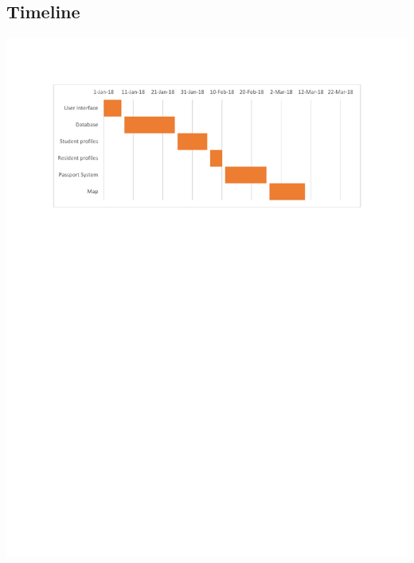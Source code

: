 \documentclass[draftclsnofoot, onecolumn, 10pt, compsoc]{IEEEtran}
\begin{document}
		\subsection{Timeline}
			\includegraphics[width=\textwidth]{GanttChart.pdf}
	
\end{document}
